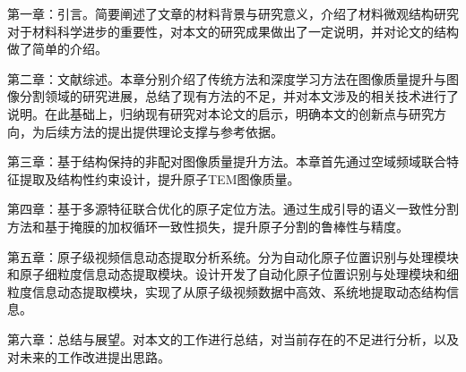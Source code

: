 第一章：引言。简要阐述了文章的材料背景与研究意义，介绍了材料微观结构研究对于材料科学进步的重要性，对本文的研究成果做出了一定说明，并对论文的结构做了简单的介绍。

第二章：文献综述。本章分别介绍了传统方法和深度学习方法在图像质量提升与图像分割领域的研究进展，总结了现有方法的不足，并对本文涉及的相关技术进行了说明。在此基础上，归纳现有研究对本论文的启示，明确本文的创新点与研究方向，为后续方法的提出提供理论支撑与参考依据。

第三章：基于结构保持的非配对图像质量提升方法。本章首先通过空域频域联合特征提取及结构性约束设计，提升原子TEM图像质量。

第四章：基于多源特征联合优化的原子定位方法。通过生成引导的语义一致性分割方法和基于掩膜的加权循环一致性损失，提升原子分割的鲁棒性与精度。

第五章：原子级视频信息动态提取分析系统。分为自动化原子位置识别与处理模块和原子细粒度信息动态提取模块。设计开发了自动化原子位置识别与处理模块和细粒度信息动态提取模块，实现了从原子级视频数据中高效、系统地提取动态结构信息。

第六章：总结与展望。对本文的工作进行总结，对当前存在的不足进行分析，以及对未来的工作改进提出思路。

